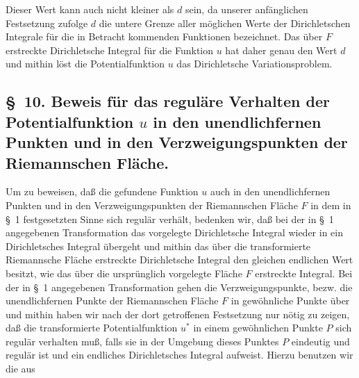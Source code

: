 \documentclass{article}
\begin{document}
Dieser Wert kann auch nicht kleiner als $d$ sein, da unserer anfänglichen Festsetzung zufolge $d$ die untere Grenze aller möglichen Werte der Dirichletschen Integrale für die in Betracht kommenden Funktionen bezeichnet. Das über $F$ erstreckte Dirichletsche Integral für die Funktion $u$ hat daher genau den Wert $d$ und mithin löst die Potentialfunktion $u$ das Dirichletsche Variationsproblem.

\subsection*{§~10. Beweis für das reguläre Verhalten der Potentialfunktion $u$ in den unendlichfernen Punkten und in den Verzweigungspunkten der Riemannschen Fläche.}

Um zu beweisen, daß die gefundene Funktion $u$ auch in den unendlichfernen Punkten und in den Verzweigungspunkten der Riemannschen Fläche $F$ in dem in §~1 festgesetzten Sinne sich regulär verhält, bedenken wir, daß bei der in §~1 angegebenen Transformation das vorgelegte Dirichletsche Integral wieder in ein Dirichletsches Integral übergeht und mithin das über die transformierte Riemannsche Fläche erstreckte Dirichletsche Integral den gleichen endlichen Wert besitzt, wie das über die ursprünglich vorgelegte Fläche $F$ erstreckte Integral. Bei der in §~1 angegebenen Transformation gehen die Verzweigungspunkte, bezw. die unendlichfernen Punkte der Riemannschen Fläche $F$ in gewöhnliche Punkte über und mithin haben wir nach der dort getroffenen Festsetzung nur nötig zu zeigen, daß die transformierte Potentialfunktion $u^*$ in einem gewöhnlichen Punkte $P$ sich regulär verhalten muß, falls sie in der Umgebung dieses Punktes $P$ eindeutig und regulär ist und ein endliches Dirichletsches Integral aufweist. Hierzu benutzen wir die aus
\end{document}
